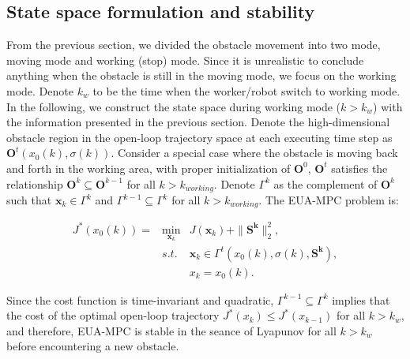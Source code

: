 \documentclass[letterpaper, 10 pt, conference]{ieeeconf}  %
\begin{document}
\subsection{State space formulation and stability}
From the previous section, we divided the obstacle movement into two mode, moving mode and working (stop) mode. Since it is unrealistic to conclude anything when the obstacle is still in the moving mode, we focus on the working mode. Denote $k_w$ to be the time when the worker/robot switch to working mode. In the following, we construct the state space during working mode ($k>k_{w}$) with the information presented in the previous section. 
Denote the high-dimensional obstacle region in the open-loop trajectory space at each executing time step as $\mathbf{O}^t(x_0(k),\sigma(k))$. Consider a special case where the obstacle is moving back and forth in the working area, with proper initialization of $\mathbf{O}^0$, $\mathbf{O}^t$ satisfies the relationship $\mathbf{O}^k \subseteq \mathbf{O}^{k-1}$ for all $k>k_{working}$. Denote $\Gamma^k$ as the complement of $\mathbf{O}^k$ such that $\mathbf{x}_k \in \Gamma^k$ and $\Gamma^{k-1} \subseteq \Gamma^k$ for all $k>k_{working}$. The EUA-MPC problem is:

\begin{eqnarray}
J^*(x_0(k))=&\min_{\mathbf{x}_{k}} & J(\mathbf{x}_k) + \|\mathbf{S^k}\|_{2}^2 ,\\
&s.t.& \mathbf{x}_k \in \Gamma^t(x_0(k),\sigma(k),\mathbf{S^k}),\\
&&         x_{k}=x_0(k).
\end{eqnarray} 

Since the cost function is time-invariant and quadratic, $\Gamma^{k-1} \subseteq \Gamma^k$ implies that the cost of the optimal open-loop trajectory $J^*(x_k) \leq J^*(x_{k-1})$ for all $k>k_{w}$, and therefore, EUA-MPC is stable in the seance of Lyapunov for all $k>k_{w}$ before encountering a new obstacle.  
\end{document}
